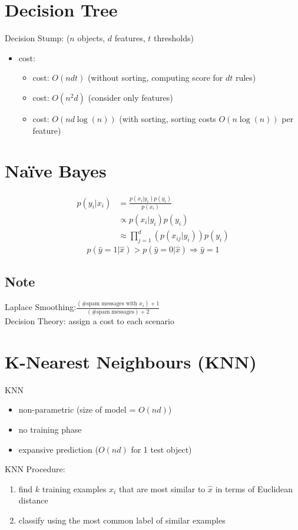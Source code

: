 \documentclass[10pt,landscape,a4paper]{article}
\begin{document}
\begin{multicols*}{5}
\section{Decision Tree}
Decision Stump: (\(n\) objects, \(d\) features, \(t\) thresholds)
\begin{itemize}
    \item cost:
    \begin{itemize}
        \item cost: \(O(ndt)\) (without sorting, computing score for \(dt\) rules)
        \item cost: \(O(n^2d)\) (consider only features)
        \item cost: \(O(nd \log(n))\) (with sorting, sorting costs \(O(n \log(n))\) per feature)
    \end{itemize}
\end{itemize}

\section{Naïve Bayes}
\begin{align*}
    p(y_i|x_i) &= \frac{p(x_i|y_i) p(y_i)}{p(x_i)} \\
    &\propto p(x_i|y_i) p(y_i) \\
    &\approx \prod_{j=1}^{d} (p(x_{ij}|y_i)) p(y_i)
\end{align*}
\begin{equation*}
    p(\hat{y} = 1|\hat{x}) > p(\hat{y}=0|\hat{x}) \Rightarrow \hat{y} = 1
\end{equation*}

\subsection{Note}
Laplace Smoothing:\(\frac{(\text{\# spam messages with } x_i)+1}{(\text{\# spam messages})+2}\) \\
Decision Theory: assign a cost to each scenario

\section{K-Nearest Neighbours (KNN)}
KNN
\begin{itemize}
    \item non-parametric (size of model = \(O(nd)\))
    \item no training phase
    \item expansive prediction (\(O(nd)\) for 1 test object)
\end{itemize}
KNN Procedure:
\begin{enumerate}
    \item find \(k\) training examples \(x_i\) that are most similar to \(\hat{x}\) in terms of Euclidean distance
    \item classify using the most common label of similar examples
\end{enumerate}


\end{multicols*}
\end{document}
